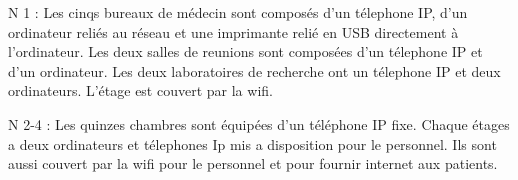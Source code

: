 %

N 1 : Les cinqs bureaux de médecin sont composés d'un télephone IP, d'un ordinateur reliés au réseau et une imprimante relié en USB directement à l'ordinateur.
Les deux salles de reunions sont composées d'un télephone IP et d'un ordinateur.
Les deux laboratoires de recherche ont un télephone IP et deux ordinateurs.
L'étage est couvert par la wifi.

%

N 2-4 : Les quinzes chambres sont équipées d'un téléphone IP fixe.
Chaque étages a deux ordinateurs et télephones Ip mis a disposition pour le personnel.
Ils sont aussi couvert par la wifi pour le personnel et pour fournir internet aux patients.

%
%














